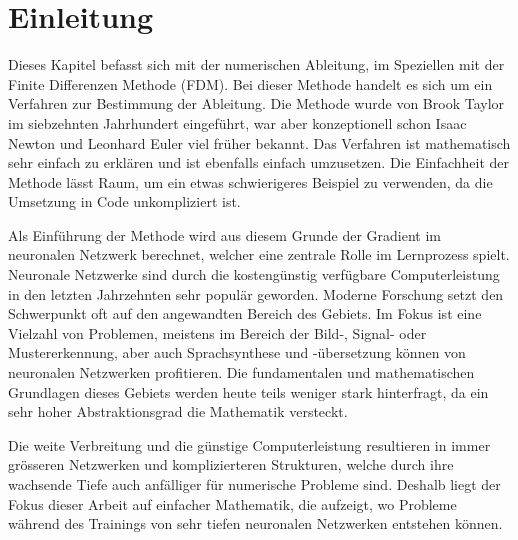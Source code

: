 %
%
%
\section{Einleitung\label{ableitung:section:einleitung}}
Dieses Kapitel befasst sich mit der numerischen Ableitung, im Speziellen mit der Finite Differenzen Methode (FDM).
%
Bei dieser Methode handelt es sich um ein Verfahren zur Bestimmung der Ableitung.
Die Methode wurde von Brook Taylor im siebzehnten Jahrhundert eingeführt, war aber konzeptionell schon Isaac Newton und Leonhard Euler viel früher bekannt. 
%
%
%
Das Verfahren ist mathematisch sehr einfach zu erklären und ist ebenfalls einfach umzusetzen. Die Einfachheit der Methode lässt Raum, um ein etwas schwierigeres Beispiel zu verwenden, da die Umsetzung in Code unkompliziert ist.

Als Einführung der Methode wird aus diesem Grunde der Gradient im neuronalen Netzwerk berechnet, welcher eine zentrale Rolle im Lernprozess spielt.
%
%
Neuronale Netzwerke sind durch die kostengünstig verfügbare
Computerleistung in den letzten Jahrzehnten sehr populär geworden.
Moderne Forschung setzt den Schwerpunkt oft auf den angewandten
Bereich des Gebiets.
Im Fokus ist eine Vielzahl von Problemen, meistens im Bereich der
Bild-, Signal- oder Mustererkennung, aber auch Sprachsynthese und
-übersetzung können von neuronalen Netzwerken profitieren.
Die fundamentalen und mathematischen Grundlagen dieses Gebiets werden heute teils weniger stark hinterfragt, da ein sehr hoher Abstraktionsgrad die Mathematik versteckt.
%
%
%
%
%

Die weite Verbreitung und die günstige Computerleistung resultieren
in immer grösseren Netzwerken und komplizierteren Strukturen, welche durch
ihre wachsende Tiefe auch anfälliger für numerische Probleme sind.
Deshalb liegt der Fokus dieser Arbeit auf einfacher Mathematik, die
aufzeigt, wo Probleme während des Trainings von sehr tiefen neuronalen
Netzwerken entstehen können.
%
